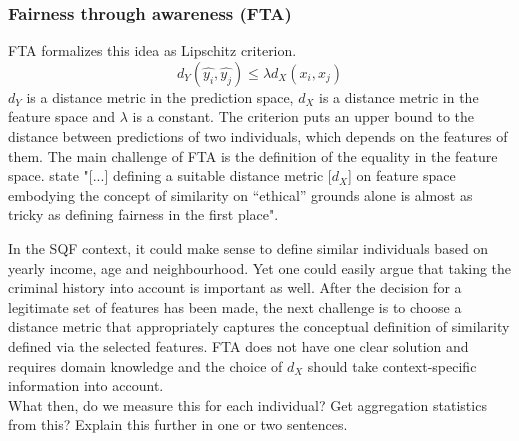 \subsubsection*{Fairness through awareness (FTA)}
FTA formalizes this idea as Lipschitz criterion. $$d_Y(\hat{y_i}, \hat{y_j}) \leq \lambda {d_X}(x_i, x_j)$$
$d_Y$ is a distance metric in the prediction space, $d_X$ is a distance metric in the feature space and $\lambda$ is a constant.
The criterion puts an upper bound to the distance between predictions of two individuals, which depends on the features of them. The main challenge of FTA is the definition of the equality in the feature space. \cite{castelnovo2022} state "[...] defining a suitable distance metric [$d_X$] on feature space embodying the concept of similarity on  “ethical” grounds alone is almost as tricky as defining fairness in the first place".\par
In the SQF context, it could make sense to define similar individuals based on yearly income, age and neighbourhood.
Yet one could easily argue that taking the criminal history into account is important as well. After the decision for a legitimate set of features has been made, the next challenge is to choose a distance metric that appropriately captures the conceptual definition of similarity defined via the selected features.
FTA does not have one clear solution and requires domain knowledge and the choice of $d_X$ should take context-specific information into account.\\
What then, do we measure this for each individual? Get aggregation statistics from this? Explain this further in one or two sentences.

